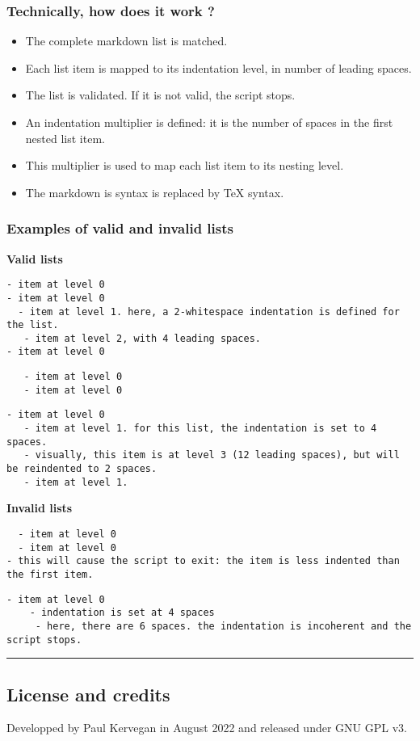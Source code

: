 \documentclass[a4paper, 12pt, twoside]{article}
\begin{document}
\subsubsection{Technically, how does it work ?}

\begin{itemize}
\item The complete markdown list is matched.
\item Each list item is mapped to its indentation level, in number of leading spaces.
\item The list is validated. If it is not valid, the script stops.
\item An indentation multiplier is defined: it is the number of spaces in the first nested list item.
\item This multiplier is used to map each list item to its nesting level.
\item The markdown is syntax is replaced by TeX syntax. 
\end{itemize}
\subsubsection{Examples of valid and invalid lists}

\noindent{}\textbf{Valid lists}

\begin{lstlisting}
- item at level 0
- item at level 0
  - item at level 1. here, a 2-whitespace indentation is defined for the list.
   - item at level 2, with 4 leading spaces.
- item at level 0
\end{lstlisting}

\begin{lstlisting}
   - item at level 0
   - item at level 0
\end{lstlisting}

\begin{lstlisting}
- item at level 0
   - item at level 1. for this list, the indentation is set to 4 spaces.
   - visually, this item is at level 3 (12 leading spaces), but will be reindented to 2 spaces.
   - item at level 1.
\end{lstlisting}

\noindent{}\textbf{Invalid lists}

\begin{lstlisting}
  - item at level 0
  - item at level 0
- this will cause the script to exit: the item is less indented than the first item.
\end{lstlisting}

\begin{lstlisting}
- item at level 0
	- indentation is set at 4 spaces
	 - here, there are 6 spaces. the indentation is incoherent and the script stops.
\end{lstlisting}

\par\noindent\rule{\linewidth}{0.4pt}
\subsection{License and credits}

Developped by Paul Kervegan in August 2022 and released under GNU GPL v3.


\clearpage
\tableofcontents
\end{document}
